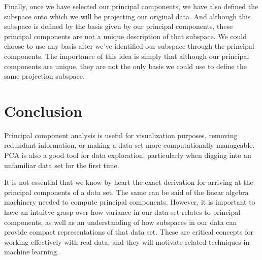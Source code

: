 Finally, once we have selected our principal components, we have also defined the subspace onto which we will be projecting our original data. And although this subspace is defined by the basis given by our principal components, these principal components are not a unique description of that subspace. We could choose to use any basis after we've identified our subspace through the principal components. The importance of this idea is simply that although our principal components are unique, they are not the only basis we could use to define the same projection subspace.

\section{Conclusion}
Principal component analysis is useful for visualization purposes, removing redundant information, or making a data set more computationally manageable. PCA is also a good tool for data exploration, particularly when digging into an unfamiliar data set for the first time.

It is not essential that we know by heart the exact derivation for arriving at the principal components of a data set. The same can be said of the linear algebra machinery needed to compute principal components. However, it is important to have an intuitve grasp over how variance in our data set relates to principal components, as well as an understanding of how subspaces in our data can provide compact representations of that data set. These are critical concepts for working effectively with real data, and they will motivate related techniques in machine learning.